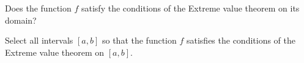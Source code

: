 \documentclass{ximera}
\begin{document}
  \begin{exercise}
   Does the function $f$ satisfy the conditions of the Extreme value theorem on its domain?
  
\begin{selectAll}
\end{selectAll}
\end{exercise}
 \begin{exercise}
   Select  all intervals $[a,b]$ so that the function $f$ satisfies the conditions of the Extreme value theorem on $[a,b]$.  
\begin{selectAll}
\choice[correct]{$[-7,-3]$}
\choice{$[-7,0]$}
\choice[correct]{$[0,4]$}
\choice{$[0,8)$}
\end{selectAll}
\end{exercise}
\end{document}
